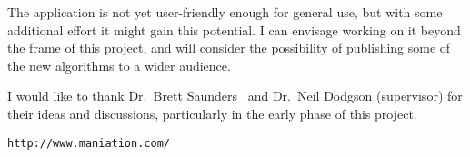 The application is not yet user-friendly enough for general use, but with some additional effort
it might gain this potential. I can envisage working on it beyond the frame of this project,
and will consider the possibility of publishing some of the new algorithms to a wider audience.

I would like to thank Dr.~Brett Saunders~\cite{Saunders} and Dr.~Neil Dodgson (supervisor) for
their ideas and discussions, particularly in the early phase of this project.

\vspace{20pt}
\centerline{\texttt{http://www.maniation.com/}}
